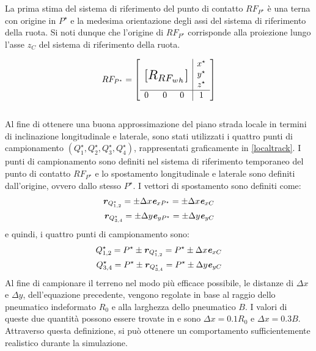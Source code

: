 La prima stima del sistema di riferimento del punto di contatto $RF_{P^\star}$ è una terna con origine in $P^\star$ e la medesima orientazione degli assi del sistema di riferimento della ruota. Si noti dunque che l'origine di $RF_{P^\star}$ corrisponde alla proiezione lungo l'asse $z_C$ del sistema di riferimento della ruota.

\begin{equation}
RF_{P^\star} = \left[
\begin{array}{ccc|c}
& & & x^\star\\
\multicolumn{3}{c|}{\multirow{3}{*}{\raisebox{20mm}{\scalebox{1.5}{$[R_{RF_{wh}}]$}}}} & y^\star\\
& & & z^\star\\ \hline
0 & ~~0 & 0 & 1
\end{array}\right]
\end{equation}\\

Al fine di ottenere una buona approssimazione del piano strada locale in termini di inclinazione longitudinale e laterale, sono stati utilizzati i quattro punti di campionamento $(Q^\star_1, Q^\star_2, Q^\star_3, Q^\star_4)$, rappresentati graficamente in \figurename{ \ref{localtrack}}. I punti di campionamento sono definiti nel sistema di riferimento temporaneo del punto di contatto $RF_{P^\star}$ e lo spostamento longitudinale e laterale sono definiti dall'origine, ovvero dallo stesso $P^\star$. I vettori di spostamento sono definiti come:
%
\begin{equation}
\begin{split}
\textbf{\textit{r}}_{Q^\star_{1,2}} = \pm \Delta x \textbf{\textit{e}}_{xP^\star} = \pm \Delta x \textbf{\textit{e}}_{xC} \\
\textbf{\textit{r}}_{Q^\star_{3,4}} = \pm \Delta y \textbf{\textit{e}}_{yP^\star} = \pm \Delta y \textbf{\textit{e}}_{yC}
\end{split}
\end{equation}
%
e quindi, i quattro punti di campionamento sono:
%
\begin{equation}
\begin{split}
Q^\star_{1,2} = P^\star \pm \textbf{\textit{r}}_{Q^\star_{1,2}} = P^\star \pm \Delta x \textbf{\textit{e}}_{xC} \\
Q^\star_{3,4} = P^\star \pm \textbf{\textit{r}}_{Q^\star_{3,4}} = P^\star \pm \Delta y \textbf{\textit{e}}_{yC}
\end{split}
\end{equation}
%
Al fine di campionare il terreno nel modo più efficace possibile, le distanze di $\Delta x$ e $\Delta y$, dell'equazione precedente, vengono regolate in base al raggio dello pneumatico indeformato $R_0$ e alla larghezza dello pneumatico $B$. I valori di queste due quantità possono essere trovate in \cite{Rill} e sono $\Delta x = 0.1 R_0$ e $\Delta x = 0.3 B$. Attraverso questa definizione, si può ottenere un comportamento sufficientemente realistico durante la simulazione.

